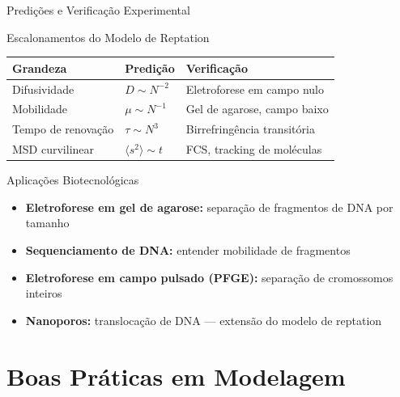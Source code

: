 \begin{frame}[shrink=5]{Predições e Verificação Experimental}
\begin{block}{Escalonamentos do Modelo de Reptation}
\begin{center}
\begin{tabular}{lll}
\hline
\textbf{Grandeza} & \textbf{Predição} & \textbf{Verificação} \\
\hline
Difusividade & $D \sim N^{-2}$ & Eletroforese em campo nulo \\
Mobilidade & $\mu \sim N^{-1}$ & Gel de agarose, campo baixo \\
Tempo de renovação & $\tau \sim N^3$ & Birrefringência transitória \\
MSD curvilinear & $\langle s^2 \rangle \sim t$ & FCS, tracking de moléculas \\
\hline
\end{tabular}
\end{center}
\end{block}

\vspace{0.2cm}

\begin{exampleblock}{Aplicações Biotecnológicas}
\begin{itemize}
    \item \textbf{Eletroforese em gel de agarose:} separação de fragmentos de DNA por tamanho
    \item \textbf{Sequenciamento de DNA:} entender mobilidade de fragmentos
    \item \textbf{Eletroforese em campo pulsado (PFGE):} separação de cromossomos inteiros
    \item \textbf{Nanoporos:} translocação de DNA — extensão do modelo de reptation
\end{itemize}
\end{exampleblock}
\end{frame}

\section{Boas Práticas em Modelagem}

